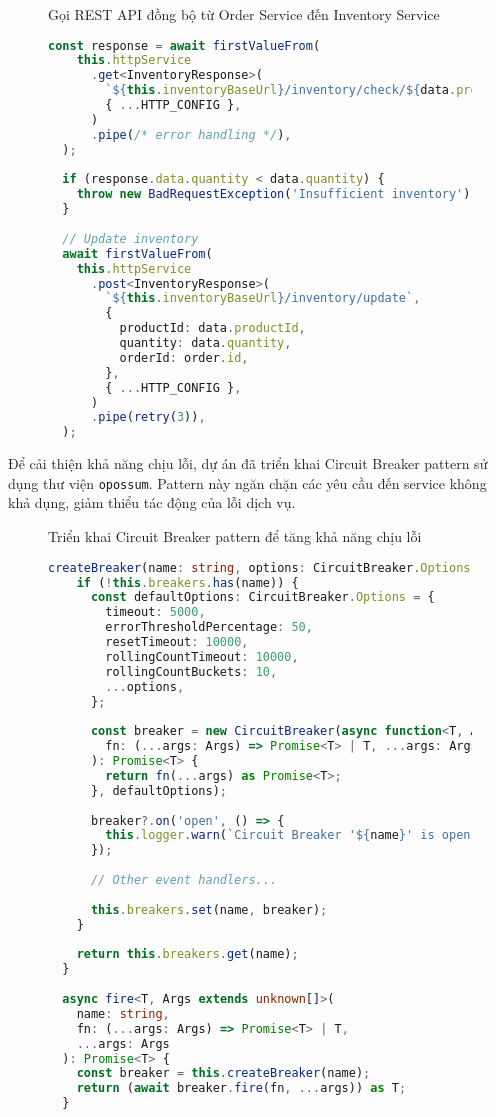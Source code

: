 \begin{figure}[H]{Gọi REST API đồng bộ từ Order Service đến Inventory Service}
  \centering
  \begin{minipage}{\textwidth}
    \begin{lstlisting}[language=Typescript, basicstyle=\scriptsize\ttfamily]
  const response = await firstValueFrom(
    this.httpService
      .get<InventoryResponse>(
        `${this.inventoryBaseUrl}/inventory/check/${data.productId}`,
        { ...HTTP_CONFIG },
      )
      .pipe(/* error handling */),
  );
  
  if (response.data.quantity < data.quantity) {
    throw new BadRequestException('Insufficient inventory');
  }
  
  // Update inventory
  await firstValueFrom(
    this.httpService
      .post<InventoryResponse>(
        `${this.inventoryBaseUrl}/inventory/update`,
        {
          productId: data.productId,
          quantity: data.quantity,
          orderId: order.id,
        },
        { ...HTTP_CONFIG },
      )
      .pipe(retry(3)),
  );
  \end{lstlisting}
  \end{minipage}
\end{figure}

Để cải thiện khả năng chịu lỗi, dự án đã triển khai Circuit Breaker pattern sử dụng thư viện \texttt{opossum}. Pattern này ngăn chặn các yêu cầu đến service không khả dụng, giảm thiểu tác động của lỗi dịch vụ.

\begin{figure}[H]{Triển khai Circuit Breaker pattern để tăng khả năng chịu lỗi}
  \centering
  \begin{minipage}{\textwidth}
    \begin{lstlisting}[language=Typescript, basicstyle=\scriptsize\ttfamily]
  createBreaker(name: string, options: CircuitBreaker.Options = {}) {
    if (!this.breakers.has(name)) {
      const defaultOptions: CircuitBreaker.Options = {
        timeout: 5000,
        errorThresholdPercentage: 50,
        resetTimeout: 10000,
        rollingCountTimeout: 10000,
        rollingCountBuckets: 10,
        ...options,
      };
  
      const breaker = new CircuitBreaker(async function<T, Args extends unknown[]>(
        fn: (...args: Args) => Promise<T> | T, ...args: Args
      ): Promise<T> {
        return fn(...args) as Promise<T>;
      }, defaultOptions);
  
      breaker?.on('open', () => {
        this.logger.warn(`Circuit Breaker '${name}' is open`);
      });
  
      // Other event handlers...
  
      this.breakers.set(name, breaker);
    }
  
    return this.breakers.get(name);
  }
  
  async fire<T, Args extends unknown[]>(
    name: string,
    fn: (...args: Args) => Promise<T> | T,
    ...args: Args
  ): Promise<T> {
    const breaker = this.createBreaker(name);
    return (await breaker.fire(fn, ...args)) as T;
  }
  \end{lstlisting}
  \end{minipage}
\end{figure}

